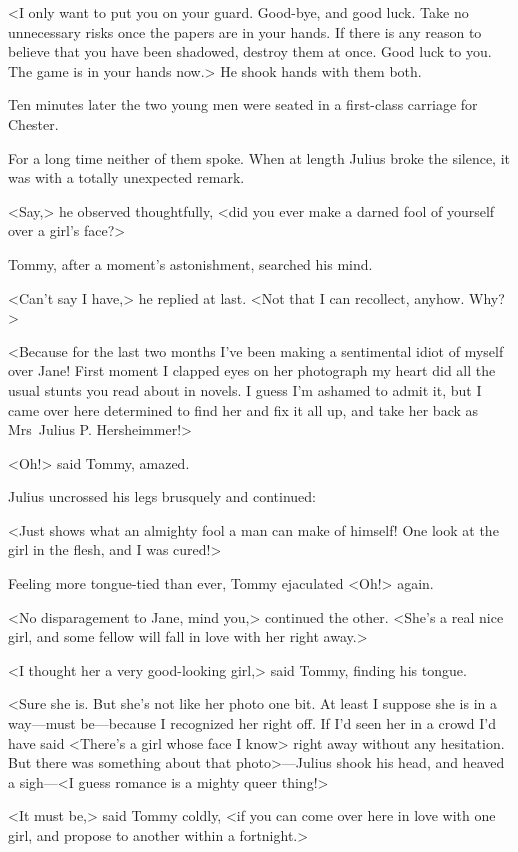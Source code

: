 <I only want to put you on your guard. Good-bye, and good luck. Take no unnecessary risks once the papers are in your hands. If there is any reason to believe that you have been shadowed, destroy them at once. Good luck to you. The game is in your hands now.> He shook hands with them both.

Ten minutes later the two young men were seated in a first-class carriage  for Chester.

For a long time neither of them spoke. When at length Julius broke the silence, it was with a totally unexpected remark.

<Say,> he observed thoughtfully, <did you ever make a darned fool of yourself over a girl's face?>

Tommy, after a moment's astonishment, searched his mind.

<Can't say I have,> he replied at last. <Not that I can recollect, anyhow. Why?>

<Because for the last two months I've been making a sentimental idiot of myself over Jane! First moment I clapped eyes on her photograph my heart did all the usual stunts you read about in novels. I guess I'm ashamed to admit it, but I came over here determined to find her and fix it all up, and take her back as Mrs~Julius P. Hersheimmer!>

<Oh!> said Tommy, amazed.

Julius uncrossed his legs brusquely and continued:

<Just shows what an almighty fool a man can make of himself! One look at the girl in the flesh, and I was cured!>

Feeling more tongue-tied than ever, Tommy ejaculated <Oh!> again.

<No disparagement to Jane, mind you,> continued the other. <She's a real nice girl, and some fellow will fall in love with her right away.>

<I thought her a very good-looking girl,> said Tommy, finding his tongue.

<Sure she is. But she's not like her photo one bit. At least I suppose she is in a way—must be—because I recognized her right off. If I'd seen her in a crowd I'd have said <There's a girl whose face I know> right away without any hesitation. But there was something about that photo>—Julius shook his head, and heaved a sigh—<I guess romance is a mighty queer thing!>

<It must be,> said Tommy coldly, <if you can come over here in love with one girl, and propose to another within a fortnight.>

